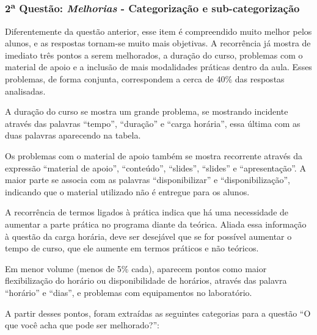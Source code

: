 

\subsubsection*{2\textsuperscript{a} Questão: \textit{Melhorias} - Categorização e sub-categorização }

Diferentemente da questão anterior, esse item é compreendido muito melhor pelos alunos, e as respostas tornam-se muito mais objetivas. A recorrência já mostra de imediato três pontos a serem melhorados, a duração do curso, problemas com o material de apoio e a inclusão de mais modalidades práticas dentro da aula. Esses problemas, de forma conjunta, correspondem a cerca de 40\% das respostas analisadas.

A duração do curso se mostra um grande problema, se mostrando incidente através das palavras \enquote{tempo}, \enquote{duração} e \enquote{carga horária}, essa última com as duas palavras aparecendo na tabela.

Os problemas com o material de apoio também se mostra recorrente através da expressão \enquote{material de apoio}, \enquote{conteúdo}, \enquote{slides}, \enquote{slides} e \enquote{apresentação}. A maior parte se associa com as palavras \enquote{disponibilizar} e \enquote{disponibilização}, indicando que o material utilizado não é entregue para os alunos.

A recorrência de termos ligados à prática indica que há uma necessidade de aumentar a parte prática no programa diante da teórica. Aliada essa informação à questão da carga horária, deve ser desejável que se for possível aumentar o tempo de curso, que ele aumente em termos práticos e não teóricos.

Em menor volume (menos de 5\% cada), aparecem pontos como maior flexibilização do horário ou disponibilidade de horários, através das palavra \enquote{horário} e \enquote{dias}, e problemas com equipamentos no laboratório.

A partir desses pontos, foram extraídas as seguintes categorias para a questão \enquote{O que você acha que pode ser melhorado?}:

